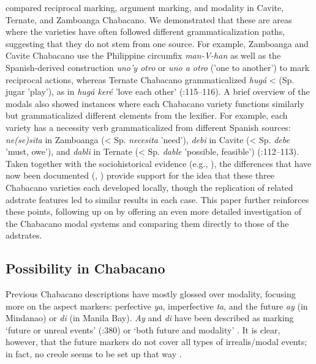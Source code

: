 \documentclass[output=paper]{langsci/langscibook}
\begin{document}
\citet{SippolaLesho2020} compared reciprocal marking, argument marking, and modality in Cavite, Ternate, and Zamboanga Chabacano. We demonstrated that these are areas where the varieties have often followed different grammaticalization paths, suggesting that they do not stem from one source. For example, Zamboanga and Cavite Chabacano use the Philippine circumfix \textit{man-V-han} as well as the Spanish-derived construction \textit{uno'y otro} or \textit{uno a otro} ('one to another') to mark reciprocal actions, whereas Ternate Chabacano grammaticalized \textit{hugá} < (Sp. jugar 'play'), as in \textit{hugá keré} 'love each other' (\citealt{SippolaLesho2020}:115–116). A brief overview of the modals also showed instances where each Chabacano variety functions similarly but grammaticalized different elements from the lexifier. For example, each variety has a necessity verb grammaticalized from different Spanish sources: \textit{ne(se)sita} in Zamboanga (< Sp. \textit{necesita} 'need'), \textit{debi} in Cavite (< Sp. \textit{debe} 'must, owe'), and \textit{dabli} in Ternate (< Sp. \textit{dable} 'possible, feasible') (\citealt{SippolaLesho2020}:112–113). Taken together with the sociohistorical evidence (e.g., \citealt{FernándezSippola2017}), the differences that have now been documented (\citealt{LeshoSippola2014}, \citealt{SippolaLesho2020}) provide support for the idea that these three Chabacano varieties each developed locally, though the replication of related adstrate features led to similar results in each case. This paper further reinforces these points, following up on \citet{SippolaLesho2020} by offering an even more detailed investigation of the Chabacano modal systems and comparing them directly to those of the adstrates.

\subsection{Possibility in Chabacano}

Previous Chabacano descriptions have mostly glossed over modality, focusing more on the aspect markers: perfective \textit{ya}, imperfective \textit{ta}, and the future \textit{ay} (in Mindanao) or \textit{di} (in Manila Bay). \textit{Ay} and \textit{di} have been described as marking ‘future or unreal events’ (\citealt{LipskiSantoro2007}:380) or ‘both future and modality’ \citep[58]{Lorenzino2000}. It is clear, however, that the future markers do not cover all types of irrealis/modal events; in fact, no creole seems to be set up that way \citep{Winford2018}. 
\end{document}
